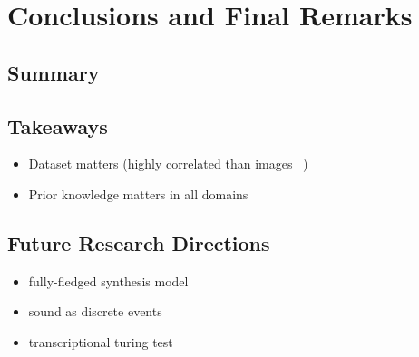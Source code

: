 
\graphicspath{{8-conclusions/figures/}}

\chapter{Conclusions and Final Remarks}
\label{ch:conclusions}

\section{Summary}

\section{Takeaways}

\begin{itemize}
	\item Dataset matters (highly correlated than images ~\cite{thickstun2018invariances})
	\item Prior knowledge matters in all domains
\end{itemize}


\section{Future Research Directions}

\begin{itemize}
	\item fully-fledged synthesis model
	\item sound as discrete events
	\item transcriptional turing test
\end{itemize}
